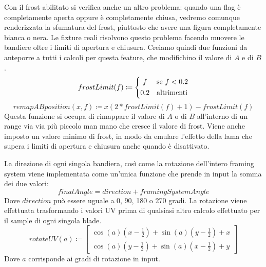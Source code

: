\documentclass[main.tex]{subfiles}
\begin{document}
Con il frost abilitato si verifica anche un altro problema: quando una flag è completamente aperta oppure è completamente chiusa, vedremo comunque renderizzata la sfumatura del frost, piuttosto che avere una figura completamente bianca o nera. Le fixture reali risolvono questo problema facendo muovere le bandiere oltre i limiti di apertura e chiusura. Creiamo quindi due funzioni da anteporre a tutti i calcoli per questa feature, che modifichino il valore di $A$ e di $B$. 
\[frostLimit(f) \coloneqq 
	\begin{dcases}
		\hfil f & \text{se } f < 0.2\\
		0.2 & \text{altrimenti}
	\end{dcases}
\]
\[remapABposition(x, f) \coloneqq x(2 * frostLimit(f) + 1) - frostLimit(f)\]
Questa funzione si occupa di rimappare il valore di $A$ o di $B$ all'interno di un range via via più piccolo man mano che cresce il valore di frost. Viene anche imposto un valore minimo di frost, in modo da emulare l'effetto della lama che supera i limiti di apertura e chiusura anche quando è disattivato.
\newline

La direzione di ogni singola bandiera, così come la rotazione dell'intero framing system viene implementata come un'unica funzione \cite{UVrotation} che prende in input la somma dei due valori:
\[finalAngle = direction + framingSystemAngle\]
Dove $direction$ può essere uguale a 0, 90, 180 o 270 gradi. La rotazione viene effettuata trasformando i valori UV prima di qualsiasi altro calcolo effettuato per il sample di ogni singola blade.
\[rotateUV(a) \coloneqq 
	\begin{bmatrix}
		\cos(a)(x - \frac{1}{2}) + \sin(a)(y - \frac{1}{2}) + x \\
		\cos(a)(y - \frac{1}{2}) + \sin(a)(x - \frac{1}{2}) + y
	\end{bmatrix}
\]
Dove $a$ corrisponde ai gradi di rotazione in input.
\end{document}
